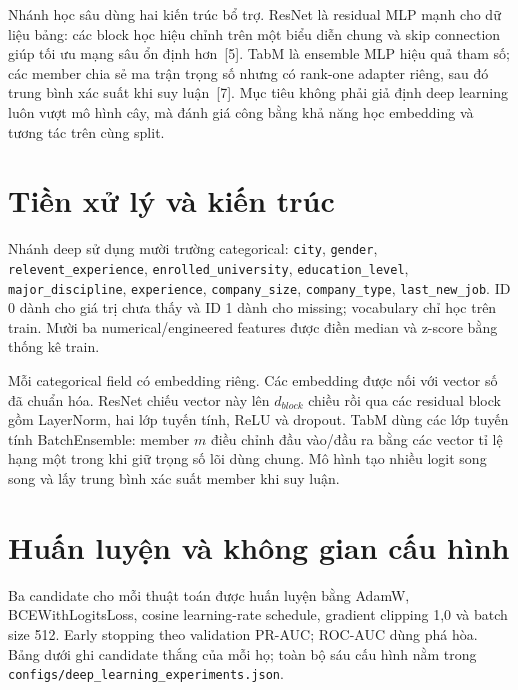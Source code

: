 \documentclass[12pt,a4paper,oneside]{report}
\newcommand{\code}[1]{\texttt{#1}}
\begin{document}
Nhánh học sâu dùng hai kiến trúc bổ trợ. ResNet là residual MLP mạnh cho dữ liệu bảng: các block học hiệu chỉnh trên một biểu diễn chung và skip connection giúp tối ưu mạng sâu ổn định hơn~[5]. TabM là ensemble MLP hiệu quả tham số; các member chia sẻ ma trận trọng số nhưng có rank-one adapter riêng, sau đó trung bình xác suất khi suy luận~[7]. Mục tiêu không phải giả định deep learning luôn vượt mô hình cây, mà đánh giá công bằng khả năng học embedding và tương tác trên cùng split.

\section{Tiền xử lý và kiến trúc}

Nhánh deep sử dụng mười trường categorical: \code{city}, \code{gender}, \code{relevent\_experience}, \code{enrolled\_university}, \code{education\_level}, \code{major\_discipline}, \code{experience}, \code{company\_size}, \code{company\_type}, \code{last\_new\_job}. ID 0 dành cho giá trị chưa thấy và ID 1 dành cho missing; vocabulary chỉ học trên train. Mười ba numerical/engineered features được điền median và z-score bằng thống kê train.

Mỗi categorical field có embedding riêng. Các embedding được nối với vector số đã chuẩn hóa. ResNet chiếu vector này lên $d_{block}$ chiều rồi qua các residual block gồm LayerNorm, hai lớp tuyến tính, ReLU và dropout. TabM dùng các lớp tuyến tính BatchEnsemble: member $m$ điều chỉnh đầu vào/đầu ra bằng các vector tỉ lệ hạng một trong khi giữ trọng số lõi dùng chung. Mô hình tạo nhiều logit song song và lấy trung bình xác suất member khi suy luận.

\section{Huấn luyện và không gian cấu hình}

Ba candidate cho mỗi thuật toán được huấn luyện bằng AdamW, BCEWithLogitsLoss, cosine learning-rate schedule, gradient clipping 1,0 và batch size 512. Early stopping theo validation PR-AUC; ROC-AUC dùng phá hòa. Bảng dưới ghi candidate thắng của mỗi họ; toàn bộ sáu cấu hình nằm trong \code{configs/deep\_learning\_experiments.json}.

\begin{table}[H]
\centering
\caption{Cấu hình học sâu được khóa trên validation}\label{tab:deep-config}
\end{table}
\end{document}
